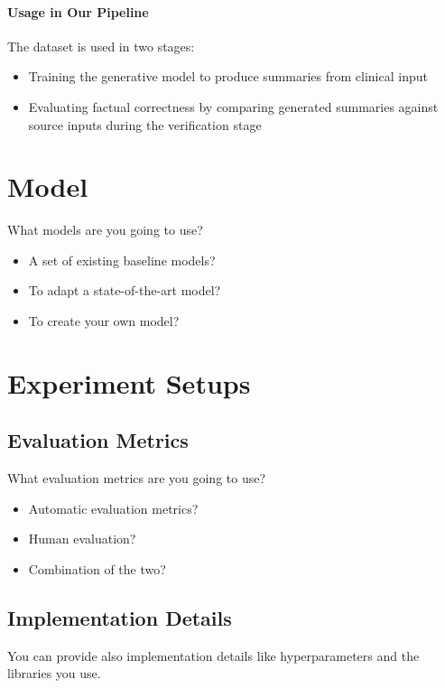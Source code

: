 \documentclass[11pt]{article}
\begin{document}
\paragraph{Usage in Our Pipeline}
The dataset is used in two stages:
\begin{itemize}
    \item Training the generative model to produce summaries from clinical input
    \item Evaluating factual correctness by comparing generated summaries against source inputs during the verification stage
\end{itemize}

\section{Model}
What models are you going to use?
\begin{itemize}
    \item A set of existing baseline models?
    \item To adapt a state-of-the-art model? 
    \item To create your own model?
\end{itemize}

\section{Experiment Setups}

\subsection{Evaluation Metrics}
What evaluation metrics are you going to use?
\begin{itemize}
    \item Automatic evaluation metrics? 
    \item Human evaluation?
    \item Combination of the two?
\end{itemize}

\subsection{Implementation Details}
You can provide also implementation details like hyperparameters and the libraries you use.
\end{document}
